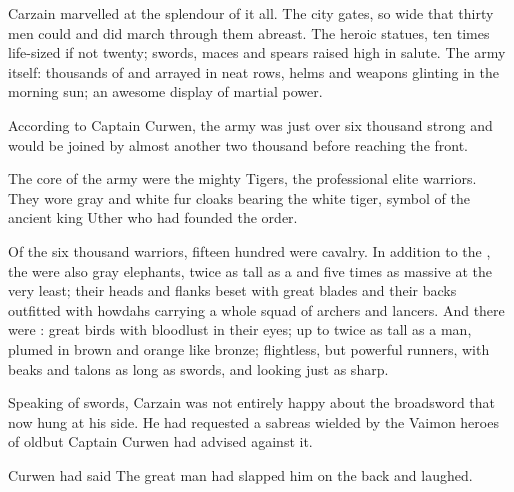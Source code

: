 




\begin{garbage}
\begin{comment}
\section{Carzain marvels}
\end{comment}

Carzain marvelled at the splendour of it all. The \Malcuric{} city gates, so wide that thirty men could and did march through them abreast. The heroic statues, ten times life-sized if not twenty; swords, maces and spears raised high in salute. The army itself: thousands of \scathae{} and \humans{} arrayed in neat rows, helms and weapons glinting in the morning sun; an awesome display of martial power. 

According to Captain Curwen, the army was just over six thousand strong and would be joined by almost another two thousand before reaching the front. 

The core of the army were the mighty Tigers, the professional elite warriors. They wore gray and white fur cloaks bearing the white tiger, symbol of the ancient king Uther who had founded the order. 

Of the six thousand warriors, fifteen hundred were cavalry. 
In addition to the \relcs, the were also gray elephants, twice as tall as a \relc{} and five times as massive at the very least; their heads and flanks beset with great blades and their backs outfitted with howdahs carrying a whole squad of archers and lancers. 
And there were \grulcans: great birds with bloodlust in their eyes; up to twice as tall as a man, plumed in brown and orange like bronze; flightless, but powerful runners, with beaks and talons as long as swords, and looking just as sharp. 

Speaking of swords, Carzain was not entirely happy about the broadsword that now hung at his side. He had requested a sabre\dash as wielded by the Vaimon heroes of old\dash but Captain Curwen had advised against it. 

 Curwen had said 
The great man had slapped him on the back and laughed. 


\end{garbage}
